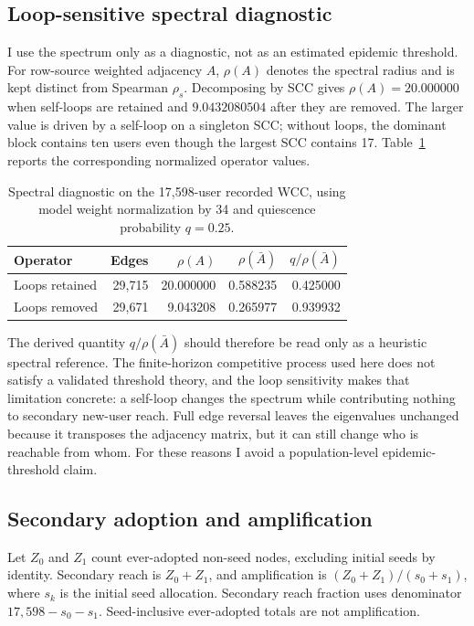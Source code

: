 \documentclass[11pt,a4paper]{article}
\begin{document}
\subsection{Loop-sensitive spectral diagnostic}
I use the spectrum only as a diagnostic, not as an estimated epidemic threshold. For row-source weighted adjacency $A$, $\rho(A)$ denotes the spectral radius and is kept distinct from Spearman $\rho_s$. Decomposing by SCC gives $\rho(A)=20.000000$ when self-loops are retained and $9.0432080504$ after they are removed. The larger value is driven by a self-loop on a singleton SCC; without loops, the dominant block contains ten users even though the largest SCC contains 17. Table~\ref{tab:spectral} reports the corresponding normalized operator values.
\begin{table}[htbp]\centering\small
\caption{Spectral diagnostic on the 17,598-user recorded WCC, using model weight normalization by 34 and quiescence probability $q=0.25$.}\label{tab:spectral}
\begin{tabular}{lrrrr}\toprule Operator & Edges & $\rho(A)$ & $\rho(\bar A)$ & $q/\rho(\bar A)$\\\midrule
Loops retained & 29,715 & 20.000000 & 0.588235 & 0.425000\\
Loops removed & 29,671 & 9.043208 & 0.265977 & 0.939932\\
\bottomrule\end{tabular}\end{table}
The derived quantity $q/\rho(\bar A)$ should therefore be read only as a heuristic spectral reference. The finite-horizon competitive process used here does not satisfy a validated threshold theory, and the loop sensitivity makes that limitation concrete: a self-loop changes the spectrum while contributing nothing to secondary new-user reach. Full edge reversal leaves the eigenvalues unchanged because it transposes the adjacency matrix, but it can still change who is reachable from whom. For these reasons I avoid a population-level epidemic-threshold claim.

\subsection{Secondary adoption and amplification}
Let $Z_0$ and $Z_1$ count ever-adopted non-seed nodes, excluding initial seeds by identity. Secondary reach is $Z_0+Z_1$, and amplification is $(Z_0+Z_1)/(s_0+s_1)$, where $s_k$ is the initial seed allocation. Secondary reach fraction uses denominator $17{,}598-s_0-s_1$. Seed-inclusive ever-adopted totals are not amplification.
\end{document}
